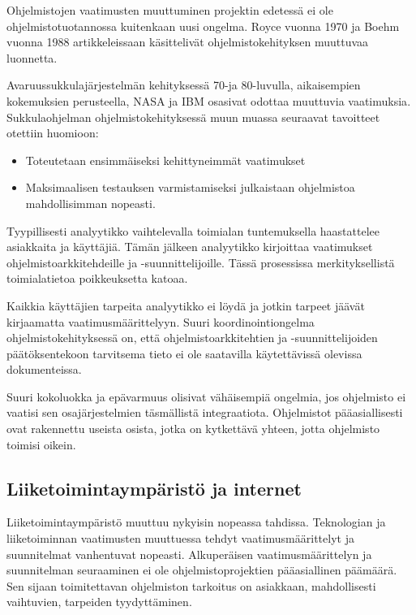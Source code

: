 \documentclass[finnish]{tktltiki2}
\theoremstyle{definition}
\theoremstyle{remark}
\begin{document}
Ohjelmistojen vaatimusten muuttuminen projektin edetessä ei ole ohjelmistotuotannossa kuitenkaan uusi ongelma. Royce vuonna 1970 ja Boehm vuonna 1988 artikkeleissaan\cite{ROY70}\cite{BOE88} käsittelivät ohjelmistokehityksen muuttuvaa luonnetta. 

Avaruussukkulajärjestelmän kehityksessä 70-ja 80-luvulla, aikaisempien kokemuksien perusteella, NASA ja IBM osasivat odottaa muuttuvia vaatimuksia\cite{MWR84}. Sukkulaohjelman ohjelmistokehityksessä muun muassa seuraavat tavoitteet otettiin huomioon: 

\begin{itemize}
 \item Toteutetaan ensimmäiseksi kehittyneimmät vaatimukset
 \item Maksimaalisen testauksen varmistamiseksi julkaistaan ohjelmistoa mahdollisimman nopeasti\cite{MWR84}.
\end{itemize}

Tyypillisesti analyytikko vaihtelevalla toimialan tuntemuksella haastattelee asiakkaita ja käyttäjiä. Tämän jälkeen analyytikko kirjoittaa vaatimukset ohjelmistoarkkitehdeille ja -suunnittelijoille. Tässä prosessissa merkityksellistä toimialatietoa poikkeuksetta katoaa\cite{KES95}.

Kaikkia käyttäjien tarpeita analyytikko ei löydä ja jotkin tarpeet jäävät kirjaamatta vaatimusmäärittelyyn. Suuri koordinointiongelma ohjelmistokehityksessä on, että ohjelmistoarkkitehtien ja -suunnittelijoiden päätöksentekoon tarvitsema tieto ei ole saatavilla käytettävissä olevissa dokumenteissa\cite{KES95}.

Suuri kokoluokka ja epävarmuus olisivat vähäisempiä ongelmia, jos ohjelmisto ei vaatisi sen osajärjestelmien täsmällistä integraatiota. Ohjelmistot pääasiallisesti ovat rakennettu useista osista, jotka on kytkettävä yhteen, jotta ohjelmisto toimisi oikein\cite{KES95}.

\subsection{Liiketoimintaympäristö ja internet}

Liiketoimintaympäristö muuttuu nykyisin nopeassa tahdissa. Teknologian ja liiketoiminnan vaatimusten muuttuessa tehdyt vaatimusmäärittelyt ja suunnitelmat vanhentuvat nopeasti\cite{WIC03}. Alkuperäisen vaatimusmäärittelyn ja suunnitelman seuraaminen ei ole ohjelmistoprojektien pääasiallinen päämäärä. Sen sijaan toimitettavan ohjelmiston tarkoitus on asiakkaan, mahdollisesti vaihtuvien, tarpeiden tyydyttäminen\cite{HIC01}.
\end{document}
